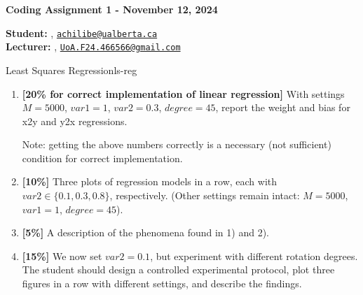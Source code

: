 





\begin{Large}
    \textsf{\textbf{Coding Assignment 1 - November 12, 2024}}
\end{Large}

\vspace{1ex}

\textsf{\textbf{Student:}} , \href{mailto:achilibe@ualberta.ca}{\texttt{achilibe@ualberta.ca}}\\
\textsf{\textbf{Lecturer:}} , \href{mailto:UoA.F24.466566@gmail.com}{\texttt{UoA.F24.466566@gmail.com}}


\vspace{2ex}

\begin{problem}{Least Squares Regression}{ls-reg}
\begin{enumerate}
  \item \textbf{[20\% for correct implementation of linear regression]} With settings $M = 5000$, $var1 = 1$, $var2 = 0.3$, $degree = 45$, report the weight and bias for x2y and y2x regressions.

Note: getting the above numbers correctly is a necessary (not sufficient) condition for correct implementation. 
 
  \item \textbf{[10\%]} Three plots of regression models in a row, each with $var2 \in \{0.1, 0.3, 0.8\}$, respectively. (Other settings remain intact: $M = 5000$, $var1 = 1$, $degree = 45$). 

  \item \textbf{[5\%]} A description of the phenomena found in 1) and 2).

  \item \textbf{[15\%]} We now set $var2 = 0.1$, but experiment with different rotation degrees. The student should design a controlled experimental protocol, plot three figures in a row with different settings, and describe the findings. 
\end{enumerate}
\end{problem}




